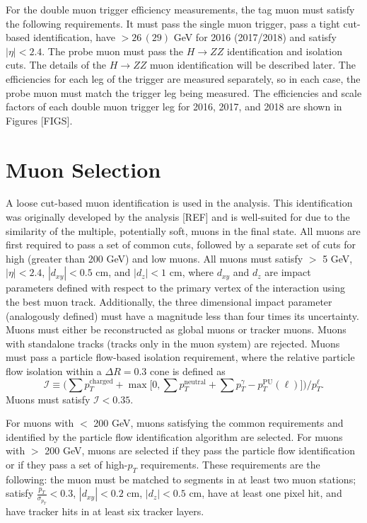 For the double muon trigger efficiency measurements, the tag muon must satisfy the following requirements. It must pass the single 
muon trigger, pass a tight cut-based identification, have \pt $> 26 \, (29)$ GeV for 2016 (2017/2018) and satisfy $|\eta| < 2.4$. The 
probe muon must pass the $H \rightarrow ZZ$ identification and isolation cuts. The details of the $H \rightarrow ZZ$ muon 
identification will be described later. The efficiencies for each leg of the trigger are measured separately, so in each case, the probe 
muon must match the trigger leg being measured. The efficiencies and scale factors of each double muon trigger leg for 2016, 2017, 
and 2018 are shown in Figures [FIGS]. 

\section{Muon Selection}
A loose cut-based muon identification is used in the analysis. This identification was originally developed by the \hzz 
analysis [REF] and is well-suited for \hzg due to the similarity of the multiple, potentially soft, muons in the final state. 
All muons are first required to pass a set of common cuts, followed by a separate set of cuts for high \pt (greater than 200 GeV) 
and low \pt muons. All muons must satisfy \pt $>$ 5 GeV, $|\eta| < 2.4$, $|d_{xy}| < 0.5$ cm, and $|d_{z}| < 1$ cm, where $d_{xy}$ and 
$d_{z}$ are impact parameters defined with respect to the primary vertex of the interaction using the best muon track. 
Additionally, the three dimensional impact parameter (analogously defined) must have a magnitude less than four times its uncertainty.
Muons must either be reconstructed as global muons or tracker muons. Muons with standalone tracks (tracks only in the muon system) are
rejected. Muons must pass a particle flow-based isolation requirement, where the relative particle flow isolation 
within a $\Delta R = 0.3$ cone is defined as 
\begin{equation}
\label{eqn:pfiso}
	\mathcal{I} \equiv \Big( \sum p_{T}^\text{charged} + \max\big[ 0, \sum p_{T}^\text{neutral} +\sum p_{T}^{\gamma} - p_{T}^\mathrm{PU}(\ell) \big] \Big) / p_{T}^{\ell}.
\end{equation}
Muons must satisfy $\mathcal{I} < 0.35$. 

For muons with \pt $<$ 200 GeV, muons satisfying the common requirements and identified by the particle flow identification
algorithm are selected. For muons with \pt $>$ 200 GeV, muons are selected if they pass the particle flow identification or if they pass
a set of high-$p_{T}$ requirements. These requirements are the following: the muon must be matched to segments in at least two muon 
stations; satisfy $\frac{p_{T}}{\sigma_{p_{T}}} < 0.3$, $|d_{xy}| < 0.2$ cm, $|d_{z}| < 0.5$ cm, have at least one pixel hit, and have 
tracker hits in at least six tracker layers.

